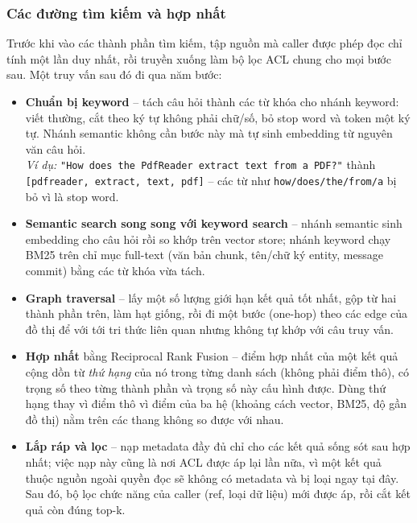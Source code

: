 \subsubsection{Các đường tìm kiếm và hợp nhất}

Trước khi vào các thành phần tìm kiếm, tập nguồn mà caller được phép đọc chỉ tính một lần duy nhất, rồi truyền xuống làm bộ lọc ACL chung cho mọi bước sau. Một truy vấn sau đó đi qua năm bước:

\begin{itemize}
  \item \textbf{Chuẩn bị keyword} -- tách câu hỏi thành các từ khóa cho nhánh keyword: viết thường, cắt theo ký tự không phải chữ/số, bỏ stop word và token một ký tự. Nhánh semantic không cần bước này mà tự sinh embedding từ nguyên văn câu hỏi. \\
  \textit{Ví dụ:} \texttt{"How does the PdfReader extract text from a PDF?"} thành \texttt{[pdfreader, extract, text, pdf]} -- các từ như \texttt{how/does/the/from/a} bị bỏ vì là stop word.
  \item \textbf{Semantic search song song với keyword search} -- nhánh semantic sinh embedding cho câu hỏi rồi so khớp trên vector store; nhánh keyword chạy BM25 trên chỉ mục full-text (văn bản chunk, tên/chữ ký entity, message commit) bằng các từ khóa vừa tách.
  \item \textbf{Graph traversal} -- lấy một số lượng giới hạn kết quả tốt nhất, gộp từ hai thành phần trên, làm hạt giống, rồi đi một bước (one-hop) theo các edge của đồ thị để với tới tri thức liên quan nhưng không tự khớp với câu truy vấn.
  \item \textbf{Hợp nhất} bằng Reciprocal Rank Fusion -- điểm hợp nhất của một kết quả cộng dồn từ \textit{thứ hạng} của nó trong từng danh sách (không phải điểm thô), có trọng số theo từng thành phần và trọng số này cấu hình được. Dùng thứ hạng thay vì điểm thô vì điểm của ba hệ (khoảng cách vector, BM25, độ gần đồ thị) nằm trên các thang không so được với nhau.
  \item \textbf{Lắp ráp và lọc} -- nạp metadata đầy đủ chỉ cho các kết quả sống sót sau hợp nhất; việc nạp này cũng là nơi ACL được áp lại lần nữa, vì một kết quả thuộc nguồn ngoài quyền đọc sẽ không có metadata và bị loại ngay tại đây. Sau đó, bộ lọc chức năng của caller (ref, loại dữ liệu) mới được áp, rồi cắt kết quả còn đúng top-k.
\end{itemize}


